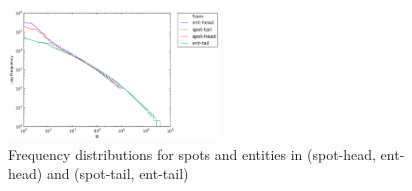 \begin{figure}
  \centering
    \includegraphics[width = 0.5\textwidth]{images/head-tail-ent-spot-dist.png}
	\caption{Frequency distributions for spots and entities in \head{} (spot-head, ent-head) and \tail{} (spot-tail, ent-tail)}
\label{img:distributions}
\end{figure}













